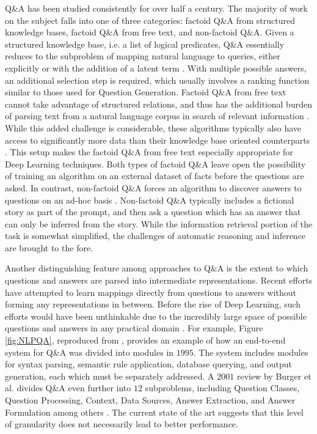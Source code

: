 Q\&A has been studied consistently for over half a century. The majority of work on the subject falls into one of three categories: factoid Q\&A from structured knowledge bases, factoid Q\&A from free text, and non-factoid Q\&A. Given a structured knowledge base, i.e. a list of logical predicates, Q\&A essentially reduces to the subproblem of mapping natural language to queries, either explicitly or with the addition of a latent term \citep{yao2014information, zelle1996learning}. With multiple possible answers, an additional selection step is required, which usually involves a ranking function similar to those used for Question Generation. Factoid Q\&A from free text cannot take advantage of structured relations, and thus has the additional burden of parsing text from a natural language corpus in search of relevant information \citep{ravichandran2002learning}. While this added challenge is considerable, these algorithms typically also have access to significantly more data than their knowledge base oriented counterparts \citep{brill2001data, hermann2015teaching}. This setup makes the factoid Q\&A from free text especially appropriate for Deep Learning techniques. Both types of factoid Q\&A leave open the possibility of training an algorithm on an external dataset of facts before the questions are asked. In contrast, non-factoid Q\&A forces an algorithm to discover answers to questions on an ad-hoc basis \citep{soricut2004automatic}. Non-factoid Q\&A typically includes a fictional story as part of the prompt, and then ask a question which has an answer that can only be inferred from the story. While the information retrieval portion of the task is somewhat simplified, the challenges of automatic reasoning and inference are brought to the fore.

Another distinguishing feature among approaches to Q\&A is the extent to which questions and answers are parsed into intermediate representations. Recent efforts have attempted to learn mappings directly from questions to answers without forming any representations in between. Before the rise of Deep Learning, such efforts would have been unthinkable due to the incredibly large space of possible questions and answers in any practical domain \citep{hirschman2001natural}. For example, Figure \ref{fig:NLPQA}, reproduced from \citep{androutsopoulos1995natural}, provides an example of how an end-to-end system for Q\&A was divided into modules in $1995$. The system includes modules for syntax parsing, semantic rule application, database querying, and output generation, each which must be separately addressed. A $2001$ review by Burger et al. divides Q\&A even further into $12$ subproblems, including Question Classes, Question Processing, Context, Data Sources, Answer Extraction, and Answer Formulation among others \citep{burger2001issues}. The current state of the art suggests that this level of granularity does not necessarily lead to better performance.  

